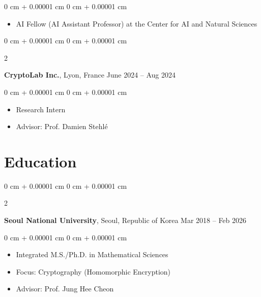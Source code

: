 \documentclass[10pt, letterpaper]{article}
\newenvironment{highlights}{
    \begin{itemize}[
        topsep=0.10 cm,
        parsep=0.10 cm,
        partopsep=0pt,
        itemsep=0pt,
        leftmargin=0 cm + 10pt
    ]
}{
    \end{itemize}
} %
\newenvironment{onecolentry}{
    \begin{adjustwidth}{
        0 cm + 0.00001 cm
    }{
        0 cm + 0.00001 cm
    }
}{
    \end{adjustwidth}
} %
\newenvironment{twocolentry}[2][]{
    \onecolentry
    \def\secondColumn{#2}
    \setcolumnwidth{\fill, 4.5 cm}
    \begin{paracol}{2}
}{
    \switchcolumn \raggedleft \secondColumn
    \end{paracol}
    \endonecolentry
} %
\begin{document}
        \vspace{0.10 cm}
        \begin{onecolentry}
            \begin{highlights}
                \item AI Fellow (AI Assistant Professor) at the Center for AI and Natural Sciences
            \end{highlights}
        \end{onecolentry}

        \vspace{0.2 cm}
        \begin{twocolentry}{
            June 2024 – Aug 2024
        }
            \textbf{CryptoLab Inc.}, Lyon, France\end{twocolentry}

        \vspace{0.10 cm}
        \begin{onecolentry}
            \begin{highlights}
                \item Research Intern
                \item Advisor: Prof. Damien Stehl\'e
            \end{highlights}
        \end{onecolentry}


    \section{Education}
        
        
        \begin{twocolentry}{
            Mar 2018 – Feb 2026
        }
            \textbf{Seoul National University}, Seoul, Republic of Korea\end{twocolentry}

        \vspace{0.10 cm}
        \begin{onecolentry}
            \begin{highlights}
                \item Integrated M.S./Ph.D. in Mathematical Sciences
                \item Focus: Cryptography (Homomorphic Encryption)
                \item Advisor: Prof. Jung Hee Cheon
            \end{highlights}
        \end{onecolentry}
\end{document}
